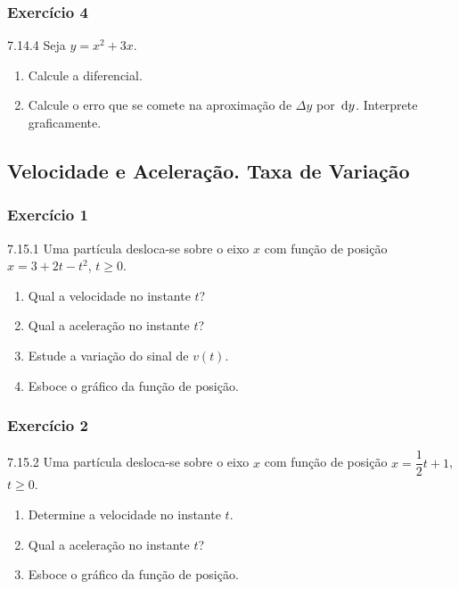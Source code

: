 \subsubsection*{Exercício 4}
\begin{exercicio}[4]{7.14.4}
Seja $y = x^2 + 3x$.
\begin{enumerate}[label=\alph*)]
    \item Calcule a diferencial.
    \item Calcule o erro que se comete na aproximação de $\Delta y$ por $\,\mathrm{d} y$. Interprete graficamente.
\end{enumerate}
\end{exercicio}

\clearpage

\subsection{Velocidade e Aceleração. Taxa de Variação}

\subsubsection*{Exercício 1}
\begin{exercicio}[1]{7.15.1}
Uma partícula desloca-se sobre o eixo $x$ com função de posição $x = 3 + 2t - t^2$, $t \ge 0$.
\begin{enumerate}[label=\alph*)]
    \item Qual a velocidade no instante $t$?
    \item Qual a aceleração no instante $t$?
    \item Estude a variação do sinal de $v(t)$.
    \item Esboce o gráfico da função de posição.
\end{enumerate}
\end{exercicio}

\subsubsection*{Exercício 2}
\begin{exercicio}[2]{7.15.2}
Uma partícula desloca-se sobre o eixo $x$ com função de posição $x = \dfrac{1}{2}t + 1$, $t \ge 0$.
\begin{enumerate}[label=\alph*)]
    \item Determine a velocidade no instante $t$.
    \item Qual a aceleração no instante $t$?
    \item Esboce o gráfico da função de posição.
\end{enumerate}
\end{exercicio}

